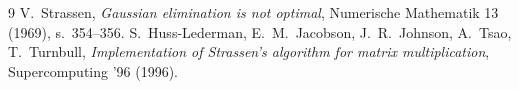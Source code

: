 \documentclass[11pt,a4paper]{article}
\begin{document}
\begin{thebibliography}{9}
 V.~Strassen, \emph{Gaussian elimination is not optimal}, Numerische Mathematik 13 (1969), s.~354--356.
 S.~Huss-Lederman, E.~M.~Jacobson, J.~R.~Johnson, A.~Tsao, T.~Turnbull,
\emph{Implementation of Strassen's algorithm for matrix multiplication}, Supercomputing '96 (1996).
\end{thebibliography}
\end{document}
